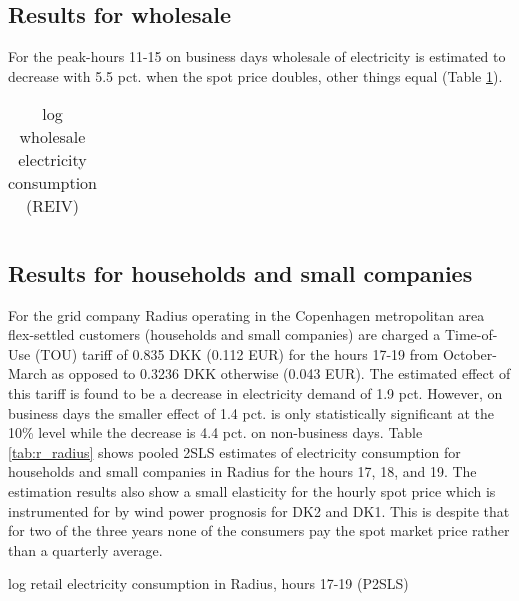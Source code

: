 \label{sec:results}
\subsection{Results for wholesale}
\label{subsec:r_wholesale}
For the peak-hours 11-15 on business days wholesale of electricity is estimated to decrease with 5.5 pct. when the spot price doubles, other things equal (Table \ref{tab:ws_preferred}).
\begin{table}[H]
  \vspace{-0.0cm}
  \centering
  \caption{log wholesale electricity consumption (REIV)}
  \footnotesize
    \begin{tabular}{lcccc}
      \toprule
        
    \end{tabular}
  \label{tab:ws_preferred}
  \vspace{-0.0cm}
\end{table}


\subsection{Results for households and small companies}
\label{subsec:r_households}
For the grid company Radius operating in the Copenhagen metropolitan area flex-settled customers (households and small companies) are charged a Time-of-Use (TOU) tariff of 0.835 DKK (0.112 EUR) for the hours 17-19 from October-March as opposed to 0.3236 DKK otherwise (0.043 EUR). The estimated effect of this tariff is found to be a decrease in electricity demand of 1.9 pct. However, on business days the smaller effect of 1.4 pct. is only statistically significant at the 10\% level while the decrease is 4.4 pct. on non-business days. Table \ref{tab:r_radius} shows pooled 2SLS estimates of electricity consumption for households and small companies in Radius for the hours 17, 18, and 19. The estimation results also show a small elasticity for the hourly spot price which is instrumented for by wind power prognosis for DK2 and DK1. This is despite that for two of the three years none of the consumers pay the spot market price rather than a quarterly average.
\begin{table}[H]
  \vspace{-0.0cm}
  \centering
  \caption{log retail electricity consumption in Radius, hours 17-19 (P2SLS)}
  \label{tab:r_radius}
  \footnotesize
        
  \vspace{-0.0cm}
\end{table}


